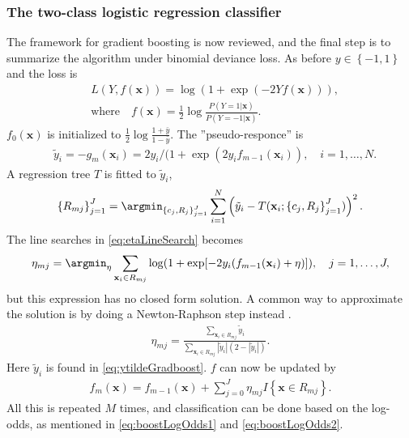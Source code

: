\subsubsection{The two-class logistic regression classifier}
\label{sub:The two-class logistic regression classifier}
The framework for gradient boosting is now reviewed, and the final step is to summarize the algorithm under binomial deviance loss. As before $y \in \left\{ -1, 1 \right\}$ and the loss is 
\begin{align}
  &L(Y, f(\mathbf{x})) = \log (1 + \exp (-2 Y f(\mathbf{x}))),\\
  &\text{where} \quad f(\mathbf{x}) = \frac{1}{2} \log \frac{ P(Y = 1 | \mathbf{x})}{ P(Y = -1 | \mathbf{x})}  .
\end{align}
$f_0(\mathbf{x})$ is initialized to $\frac{1}{2} \log \frac{1+\bar{y}}{1-\bar{y}}$.  The ''pseudo-responce'' is
\begin{align}
  \label{eq:ytildeGradboost} 
  &\tilde{y}_i = -g_m(\mathbf{x}_i) = 2 y_i / (1 + \exp \left( 2 y_i f_{m-1}(\mathbf{x}_i) \right), \quad i = 1, \ldots, N.
\end{align}
A regression tree $T$ is fitted to $\tilde y_i$,
\begin{align}
  \left\{ R_{m j} \right\}_{j = 1}^J  = 
  \argmin_{\left\{ c_j, R_{j} \right\}_{j = 1}^J} \sum^{N}_{i=1} \left( \tilde y_i - T(\mathbf{x}_i; \left\{ c_j, R_j \right\}_{j = 1}^J) \right)^2.
\end{align}
The line searches in \eqref{eq:etaLineSearch} becomes
\begin{align}
  \eta_{m j} = \argmin_\eta  \sum_{\mathbf{x}_i \in R_{m j}} \log (1 + \exp [-2 y_i (f_{m-1}(\mathbf{x}_i) + \eta) ]), \quad j = 1, \ldots, J,
\end{align}
but this expression has no closed form solution. A common way to approximate the solution is by doing a Newton-Raphson step instead \cite{friedman}.
\begin{align}
  \eta_{m j} =  \frac{\sum_{\mathbf{x}_i \in R_{m j}} \tilde y_i}{\sum_{\mathbf{x}_i \in R_{m j}} |\tilde y_i|(2-|\tilde y_i|)}.
\end{align}
Here  $\tilde y_i$ is found in \eqref{eq:ytildeGradboost}. $f$ can now be updated by
\begin{align}
  f_m(\mathbf{x}) = f_{m-1}(\mathbf{x}) +  \sum^{J}_{j=0} \eta_{m j} I\left\{ \mathbf{x} \in R_{m j} \right\}.
\end{align}
All this is repeated $M$ times, and classification can be done based on the log-odds, as mentioned in \eqref{eq:boostLogOdds1} and \eqref{eq:boostLogOdds2}. \\
